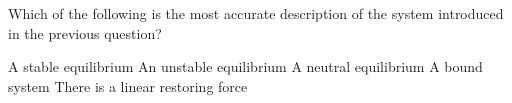 \documentclass{../../../oss-apphys-exam}
\begin{document}
\begin{questions}
  \question Which of the following is the most accurate description of the
  system introduced in the previous question?
  \label{q:well2}
  \begin{choices}
    \choice A stable equilibrium
    \choice An unstable equilibrium
    \choice A neutral equilibrium
    \choice A bound system
    \choice There is a linear restoring force
  \end{choices}
    
    

\end{questions}
\end{document}
